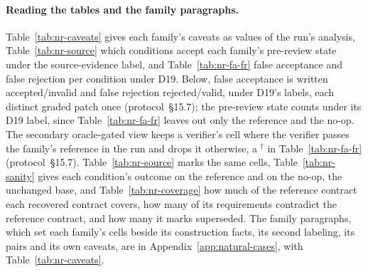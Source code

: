 \paragraph{Reading the tables and the family paragraphs.}
Table~\ref{tab:nr-caveats} gives each family's caveats as values of the run's analysis, Table~\ref{tab:nr-source}
which conditions accept each family's pre-review state under the source-evidence label, and Table~\ref{tab:nr-fa-fr}
false acceptance and false rejection per condition under D19. Below, false acceptance is written accepted/invalid and
false rejection rejected/valid, under D19's labels, each distinct graded patch once (protocol~\S15.7); the pre-review
state counts under its D19 label, since Table~\ref{tab:nr-fa-fr} leaves out only the reference and the no-op. The
secondary oracle-gated view keeps a verifier's cell where the verifier passes the family's reference in the run and
drops it otherwise, a $^{\dagger}$ in Table~\ref{tab:nr-fa-fr} (protocol~\S15.7). Table~\ref{tab:nr-source} marks
the same cells, Table~\ref{tab:nr-sanity} gives each condition's outcome on the reference and on the no-op, the
unchanged base, and Table~\ref{tab:nr-coverage} how much of the reference contract each recovered contract covers, how
many of its requirements contradict the reference contract, and how many it marks superseded.
The family paragraphs, which set each family's cells beside its construction facts, its second labeling, its pairs and
its own caveats, are in Appendix~\ref{app:natural-cases}, with Table~\ref{tab:nr-caveats}.



